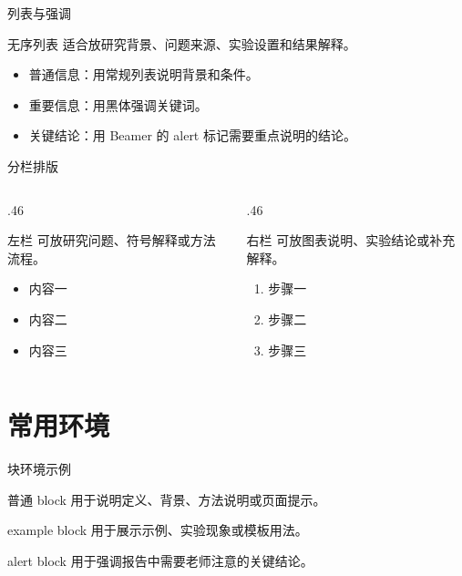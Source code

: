 \documentclass[12pt,aspectratio=43]{beamer}
\newcommand{\SUSTEmph}[1]{{\SUSTHei #1}}
\newcommand{\SUSTSectionTitleThree}{常用环境}
\begin{document}
\begin{frame}{列表与强调}
  \begin{block}{无序列表}
    适合放研究背景、问题来源、实验设置和结果解释。
  \end{block}

  \begin{itemize}
    \item 普通信息：用常规列表说明背景和条件。
    \item \SUSTEmph{重要信息}：用黑体强调关键词。
    \item \alert{关键结论}：用 Beamer 的 alert 标记需要重点说明的结论。
  \end{itemize}
\end{frame}

\begin{frame}{分栏排版}
  \begin{columns}[T,totalwidth=\textwidth]
    \begin{column}{.46\textwidth}
      \begin{block}{左栏}
        可放研究问题、符号解释或方法流程。
      \end{block}

      \begin{itemize}
        \item 内容一
        \item 内容二
        \item 内容三
      \end{itemize}
    \end{column}
    \begin{column}{.46\textwidth}
      \begin{block}{右栏}
        可放图表说明、实验结论或补充解释。
      \end{block}

      \begin{enumerate}
        \item 步骤一
        \item 步骤二
        \item 步骤三
      \end{enumerate}
    \end{column}
  \end{columns}
\end{frame}

\section{\SUSTSectionTitleThree}

\begin{frame}{块环境示例}
  \begin{block}{普通 block}
    用于说明定义、背景、方法说明或页面提示。
  \end{block}

  \begin{exampleblock}{example block}
    用于展示示例、实验现象或模板用法。
  \end{exampleblock}

  \begin{alertblock}{alert block}
    用于强调报告中需要老师注意的关键结论。
  \end{alertblock}
\end{frame}
\end{document}
